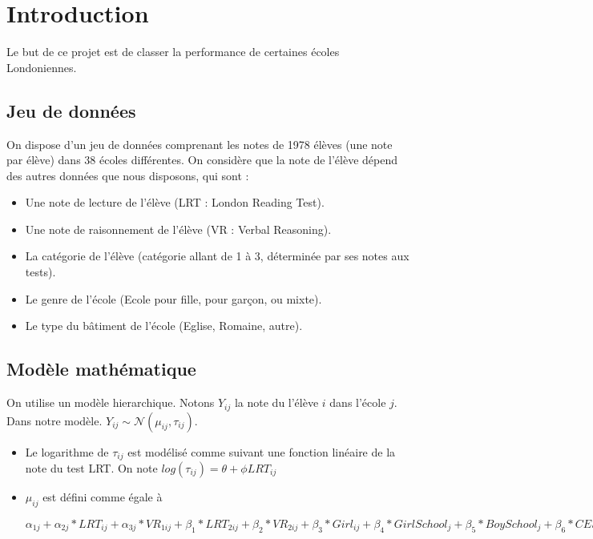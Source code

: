\section{Introduction}
Le but de ce projet est de classer la performance de certaines écoles Londoniennes.
 
    \subsection{Jeu de données}
    On dispose d'un jeu de données comprenant les notes de 1978 élèves (une note par élève) dans 38 écoles différentes. On considère que la note de l'élève dépend des autres données que nous disposons, qui sont : 
    \begin{itemize}
        \item Une note de lecture de l'élève (LRT : London Reading Test).
        \item Une note de raisonnement de l'élève (VR : Verbal Reasoning).
        \item La catégorie de l'élève (catégorie allant de 1 à 3, déterminée par ses notes aux tests).
                \item Le genre de l'école (Ecole pour fille, pour garçon, ou mixte).
        \item Le type du bâtiment de l'école (Eglise, Romaine, autre).
    \end{itemize}
    
    
    \subsection{Modèle mathématique}
    On utilise un modèle hierarchique. Notons $Y_{ij}$ la note du l'élève $i$ dans l'école $j$.
    Dans notre modèle. $Y_{ij} \sim \mathcal{N}( \mu_{ij}, \tau_{ij})$. 
    \begin{itemize}
        \item Le logarithme de $\tau_{ij}$ est modélisé comme suivant une fonction linéaire de la note du test LRT. On note $log (\tau_{ij}) = \theta + \phi LRT_{ij}$
        \item $\mu_{ij}$ est défini comme égale à 
        
        $\alpha_{1j} 
        + \alpha_{2j}* LRT_{ij} 
        + \alpha_{3j}* VR_{1ij} 
        + \beta_{1}* LRT_{2ij} 
        + \beta_{2}* VR_{2ij} 
        + \beta_{3}* Girl_{ij} 
        + \beta_{4}* GirlSchool_{j} 
        + \beta_{5}* BoySchool_{j} 
        + \beta_{6}* CESchool_{j} 
        + \beta_{7}* RCSchool_{j} 
        + \beta_{8}* OtherSchool_{j}$
    \end{itemize}
    
